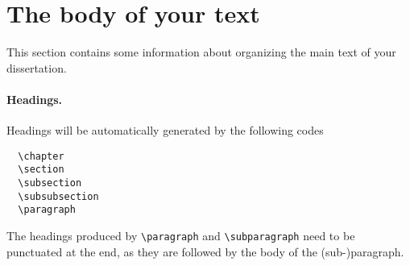 \section{The body of your text}
This section contains some information about organizing the main
text of your dissertation.

\paragraph*{Headings.}
Headings will be automatically generated by the following codes
\begin{verbatim}
  \chapter
  \section
  \subsection
  \subsubsection
  \paragraph
\end{verbatim}
The headings produced by \verb|\paragraph| and \verb|\subparagraph| 
need to be punctuated at the end,
as they are followed by the body of the (sub-)paragraph.

